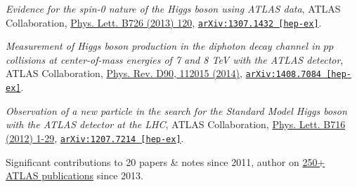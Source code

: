 \documentclass{letter}
\begin{document}
\textit{Evidence for the spin-0 nature of the Higgs boson using ATLAS data}, ATLAS Collaboration, \href{http://www.sciencedirect.com/science/article/pii/S0370269313006527?np=y}{Phys. Lett. B726 (2013) 120}, \href{https://arxiv.org/abs/1307.1432}{\texttt{arXiv:1307.1432 [hep-ex]}}.

\textit{Measurement of Higgs boson production in the diphoton decay channel in $pp$ collisions at center-of-mass energies of 7 and 8 TeV with the ATLAS detector}, ATLAS Collaboration, \href{http://journals.aps.org/prd/abstract/10.1103/PhysRevD.90.112015}{Phys. Rev. D90, 112015 (2014)}, \href{http://arxiv.org/abs/1408.7084}{\texttt{arXiv:1408.7084 [hep-ex]}}.

\textit{Observation of a new particle in the search for the Standard Model Higgs boson with the ATLAS detector at the LHC}, ATLAS Collaboration, \href{http://www.sciencedirect.com/science/article/pii/S037026931200857X}{Phys. Lett. B716 (2012) 1-29}, \href{https://arxiv.org/abs/1207.7214}{\texttt{arXiv:1207.7214 [hep-ex]}}.

\begin{flushright}
Significant contributions to 20 papers \& notes since 2011, author on \href{https://twiki.cern.ch/twiki/bin/view/AtlasPublic}{250+ ATLAS publications} since 2013.\\
\end{flushright}


\begin{flushleft}
  \Large{\textsc{\textbf{\color{Maroon}{Selected Conference Presentations}}}}
  \vspace{1pt} %
\end{flushleft}
\end{document}
